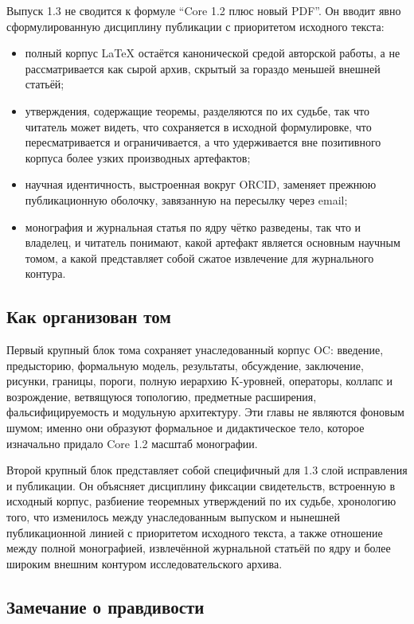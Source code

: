 Выпуск 1.3 не сводится к формуле ``Core 1.2 плюс новый PDF''.
Он вводит явно сформулированную дисциплину публикации с приоритетом исходного текста:

\begin{itemize}
\item полный корпус LaTeX остаётся канонической средой авторской работы, а не рассматривается как сырой архив, скрытый за гораздо меньшей внешней статьёй;
\item утверждения, содержащие теоремы, разделяются по их судьбе, так что читатель может видеть, что сохраняется в исходной формулировке, что пересматривается и ограничивается, а что удерживается вне позитивного корпуса более узких производных артефактов;
\item научная идентичность, выстроенная вокруг ORCID, заменяет прежнюю публикационную оболочку, завязанную на пересылку через email;
\item монография и журнальная статья по ядру чётко разведены, так что и владелец, и читатель понимают, какой артефакт является основным научным томом, а какой представляет собой сжатое извлечение для журнального контура.
\end{itemize}

\subsection{Как организован том}

Первый крупный блок тома сохраняет унаследованный корпус OC: введение, предысторию, формальную модель, результаты, обсуждение, заключение, рисунки, границы, пороги, полную иерархию K-уровней, операторы, коллапс и возрождение, ветвящуюся топологию, предметные расширения, фальсифицируемость и модульную архитектуру. Эти главы не являются фоновым шумом; именно они образуют формальное и дидактическое тело, которое изначально придало Core 1.2 масштаб монографии.

Второй крупный блок представляет собой специфичный для 1.3 слой исправления и публикации.
Он объясняет дисциплину фиксации свидетельств, встроенную в исходный корпус, разбиение теоремных утверждений по их судьбе, хронологию того, что изменилось между унаследованным выпуском и нынешней публикационной линией с приоритетом исходного текста, а также отношение между полной монографией, извлечённой журнальной статьёй по ядру и более широким внешним контуром исследовательского архива.

\subsection{Замечание о правдивости}

